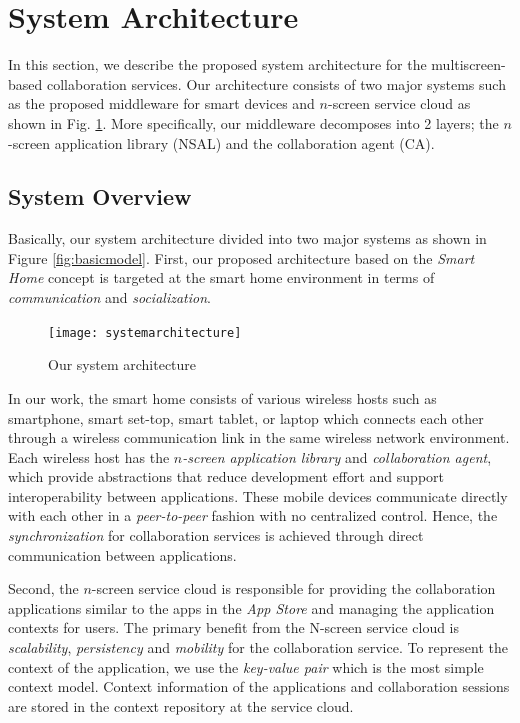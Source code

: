 \documentclass{sig-alternate}
\begin{document}
\section{System Architecture}
    \label{sc:Architecture}
    In this section, we describe the proposed system architecture for the multiscreen-based collaboration services.
    Our architecture consists of two major systems such as the proposed middleware for smart devices and $n$-screen service cloud as shown in Fig. \ref{fig:architecture}. More specifically, our middleware decomposes into 2 layers;  the $n$-screen application library (NSAL) and the collaboration agent (CA).  

\subsection{System Overview}
Basically, our system architecture divided into two major systems as shown in Figure  \ref{fig:basicmodel}. 
First, our proposed architecture based on the \textit{Smart Home} concept is targeted at the smart home environment in terms of \textit{communication} and \textit{socialization}. 
    \begin{figure}[htb] %
    \centering
    \texttt{[image: systemarchitecture]}
    \caption{Our system architecture}
    \label{fig:architecture}
    \end{figure}

In our work, the smart home consists of various wireless hosts such as smartphone, smart set-top, smart tablet, or laptop which connects each other through a wireless communication link in the same wireless network environment. Each wireless host has the \textit{$n$-screen application library} and \textit{collaboration agent}, which provide abstractions that reduce development effort and support interoperability between applications. These mobile devices communicate directly with each other in a \textit{peer-to-peer} fashion with no centralized control.  Hence, the \textit{synchronization} for collaboration services is achieved through direct communication between applications.

Second,  the $n$-screen service cloud is responsible for providing the collaboration applications similar to the apps in the \textit{App Store} and managing the application contexts  for users. 
The primary benefit from the N-screen service cloud is \textit{scalability}, \textit{persistency} and \textit{mobility} for the collaboration service. 
 To represent the context of the application, we use the \textit{key-value pair} which is the most simple context model. Context information of the applications and collaboration sessions are stored in the context repository at the service cloud.
\end{document}
